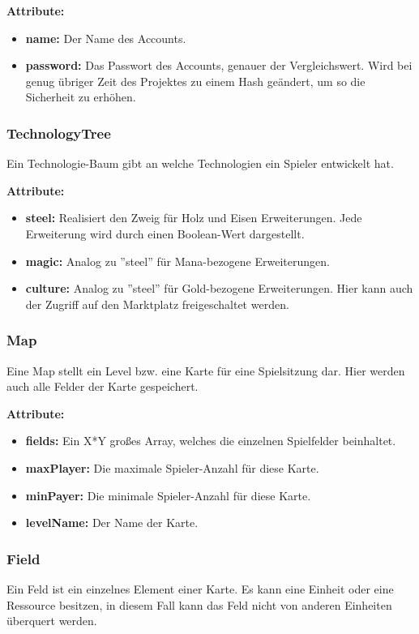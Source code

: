 \documentclass[fontsize=12pt,paper=a4,twoside]{scrartcl}
\begin{document}
\textbf{Attribute:}
\begin{itemize}
\item \textbf{name:} Der Name des Accounts.
\item \textbf{password:} Das Passwort des Accounts, genauer der Vergleichswert. Wird bei genug übriger Zeit des Projektes zu einem Hash geändert, um so die Sicherheit zu erhöhen.
\end{itemize}

\subsubsection{TechnologyTree}

Ein Technologie-Baum gibt an welche Technologien ein Spieler entwickelt hat.

\textbf{Attribute:}
\begin{itemize}
\item \textbf{steel:} Realisiert den Zweig für Holz und Eisen Erweiterungen. Jede Erweiterung wird durch einen Boolean-Wert dargestellt.
\item \textbf{magic:} Analog zu ''steel'' für Mana-bezogene Erweiterungen.
\item \textbf{culture:} Analog zu ''steel'' für Gold-bezogene Erweiterungen. Hier kann auch der Zugriff auf den Marktplatz freigeschaltet werden. 
\end{itemize}

\subsubsection{Map}

Eine Map stellt ein Level bzw. eine Karte für eine Spielsitzung dar. Hier werden auch alle Felder der Karte gespeichert.

\textbf{Attribute:}
\begin{itemize}
\item \textbf{fields:} Ein X*Y großes Array, welches die einzelnen Spielfelder beinhaltet.
\item \textbf{maxPlayer:} Die maximale Spieler-Anzahl für diese Karte.
\item \textbf{minPayer:} Die minimale Spieler-Anzahl für diese Karte.
\item \textbf{levelName:} Der Name der Karte.
\end{itemize}

\subsubsection{Field}
Ein Feld ist ein einzelnes Element einer Karte. Es kann eine Einheit oder eine Ressource besitzen, in diesem Fall kann das Feld nicht von anderen Einheiten überquert werden.
\end{document}
